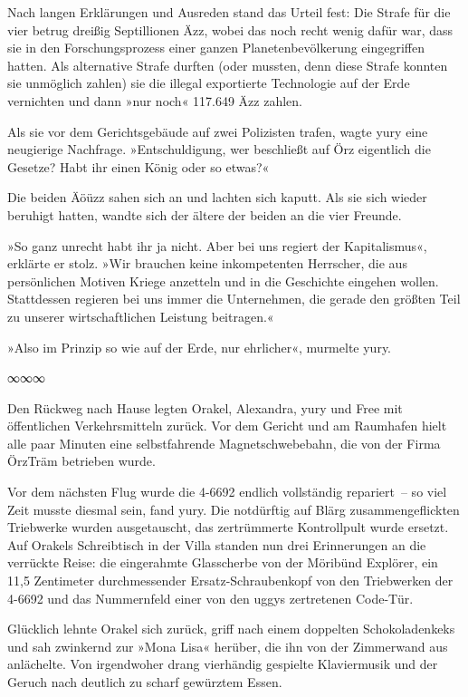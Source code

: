 Nach langen Erklärungen und Ausreden stand das Urteil fest: Die Strafe für die vier betrug dreißig Septillionen Äzz, wobei das noch recht wenig dafür war, dass sie in den Forschungsprozess einer ganzen Planetenbevölkerung eingegriffen hatten. Als alternative Strafe durften (oder mussten, denn diese Strafe konnten sie unmöglich zahlen) sie die illegal exportierte Technologie auf der Erde vernichten und dann »nur noch« 117.649 Äzz zahlen.

Als sie vor dem Gerichtsgebäude auf zwei Polizisten trafen, wagte yury eine neugierige Nachfrage. »Entschuldigung, wer beschließt auf Örz eigentlich die Gesetze? Habt ihr einen König oder so etwas?«

Die beiden Äöüzz sahen sich an und lachten sich kaputt. Als sie sich wieder beruhigt hatten, wandte sich der ältere der beiden an die vier Freunde.

»So ganz unrecht habt ihr ja nicht. Aber bei uns regiert der Kapitalismus«, erklärte er stolz. »Wir brauchen keine inkompetenten Herrscher, die aus persönlichen Motiven Kriege anzetteln und in die Geschichte eingehen wollen. Stattdessen regieren bei uns immer die Unternehmen, die gerade den größten Teil zu unserer wirtschaftlichen Leistung beitragen.«

»Also im Prinzip so wie auf der Erde, nur ehrlicher«, murmelte yury.

\begin{center}
    ∞∞∞
\end{center}

Den Rückweg nach Hause legten Orakel, Alexandra, yury und Free mit öffentlichen Verkehrsmitteln zurück. Vor dem Gericht und am Raumhafen hielt alle paar Minuten eine selbstfahrende Magnetschwebebahn, die von der Firma ÖrzTräm betrieben wurde.

Vor dem nächsten Flug wurde die 4-6692 endlich vollständig repariert~– so viel Zeit musste diesmal sein, fand yury. Die notdürftig auf Blärg zusammengeflickten Triebwerke wurden ausgetauscht, das zertrümmerte Kontrollpult wurde ersetzt. Auf Orakels Schreibtisch in der Villa standen nun drei Erinnerungen an die verrückte Reise: die eingerahmte Glasscherbe von der Möribünd Explörer, ein 11,5 Zentimeter durchmessender Ersatz-Schraubenkopf von den Triebwerken der 4-6692 und das Nummernfeld einer von den uggys zertretenen Code-Tür.

Glücklich lehnte Orakel sich zurück, griff nach einem doppelten Schokoladenkeks und sah zwinkernd zur »Mona Lisa« herüber, die ihn von der Zimmerwand aus anlächelte. Von irgendwoher drang vierhändig gespielte Klaviermusik und der Geruch nach deutlich zu scharf gewürztem Essen.

